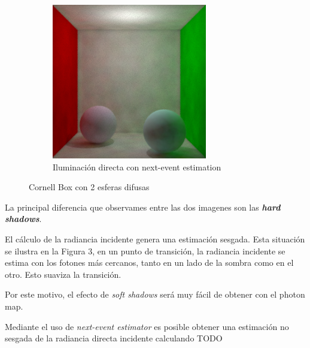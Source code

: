 \documentclass{article}
\begin{document}
\begin{figure}
\begin{subfigure}[h]{0.4\linewidth}
\includegraphics[width=\linewidth]{imgs/pmdl.png}
\caption{Iluminación directa con next-event estimation}
\end{subfigure}
\caption{Cornell Box con 2 esferas difusas}
\end{figure}

La principal diferencia que observames entre las dos imagenes son las
\textbf{\textit{hard shadows}}.

El cálculo de la radiancia incidente genera una estimación sesgada. Esta
situación se ilustra en la Figura 3, en un punto de transición, la radiancia
incidente se estima con los fotones más cercanos, tanto en un lado de la sombra
como en el otro. Esto suaviza la transición.

Por este motivo, el efecto de \textit{soft shadows} será muy fácil de obtener
con el photon map.

Mediante el uso de \textit{next-event estimator} es posible obtener una estimación no sesgada de la radiancia directa incidente calculando TODO
\end{document}
